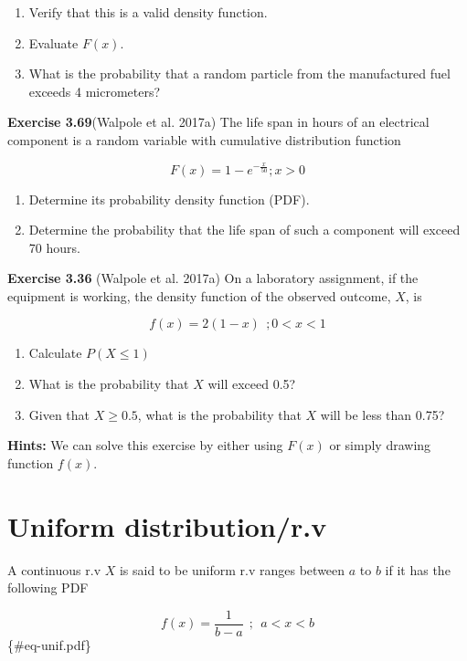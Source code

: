 \documentclass[
  11pt,
  letterpaper,
  DIV=11,
  numbers=noendperiod]{scrreprt}
\providecommand{\tightlist}{%
  \setlength{\itemsep}{0pt}\setlength{\parskip}{0pt}}
\begin{document}
\begin{enumerate}
\def\labelenumi{(\alph{enumi})}
\tightlist
\item
  Verify that this is a valid density function.
\item
  Evaluate \(F(x)\).
\item
  What is the probability that a random particle from the manufactured
  fuel exceeds 4 micrometers?
\end{enumerate}

\textbf{Exercise 3.69}(Walpole et al. 2017a) The life span in hours of
an electrical component is a random variable with cumulative
distribution function

\[F(x)=1-e^{-\frac{x}{50}}; x>0\]

\begin{enumerate}
\def\labelenumi{(\alph{enumi})}
\item
  Determine its probability density function (PDF).
\item
  Determine the probability that the life span of such a component will
  exceed 70 hours.
\end{enumerate}

\textbf{Exercise 3.36} (Walpole et al. 2017a) On a laboratory
assignment, if the equipment is working, the density function of the
observed outcome, \(X\), is

\[f(x)=2(1-x) \ \ ; 0<x<1\]

\begin{enumerate}
\def\labelenumi{\alph{enumi}.}
\item
  Calculate \(P(X\le 1)\)
\item
  What is the probability that \(X\) will exceed 0.5?
\item
  Given that \(X \ge 0.5\), what is the probability that \(X\) will be
  less than 0.75?
\end{enumerate}

\textbf{Hints:} We can solve this exercise by either using \(F(x)\) or
simply drawing function \(f(x)\).

\section{Uniform distribution/r.v}\label{uniform-distributionr.v}

A continuous r.v \(X\) is said to be uniform r.v ranges between \(a\) to
\(b\) if it has the following PDF

\[f(x)=\frac{1}{b-a} \ \ ; \ \ a<x<b\] \{\#eq-unif.pdf\}
\end{document}

